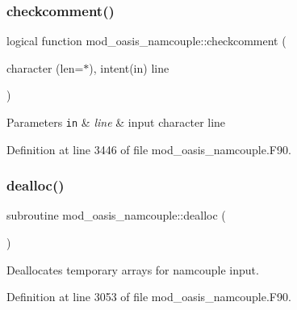 \mbox{\label{namespacemod__oasis__namcouple_a4551fbe4bcd69bc6d0d4f6e1ee52ea86}} 
\subsubsection{\texorpdfstring{checkcomment()}{checkcomment()}}
{\footnotesize\ttfamily logical function mod\+\_\+oasis\+\_\+namcouple\+::checkcomment (\begin{DoxyParamCaption}\item[{character (len=$\ast$), intent(in)}]{line }\end{DoxyParamCaption})\hspace{0.3cm}{\ttfamily [private]}}


\begin{DoxyParams}[1]{Parameters}
\mbox{\tt in}  & {\em line} & input character line \\
\hline
\end{DoxyParams}


Definition at line 3446 of file mod\+\_\+oasis\+\_\+namcouple.\+F90.

\mbox{\label{namespacemod__oasis__namcouple_abf09a0e902f44f77874a75bb4a7fba33}} 
\subsubsection{\texorpdfstring{dealloc()}{dealloc()}}
{\footnotesize\ttfamily subroutine mod\+\_\+oasis\+\_\+namcouple\+::dealloc (\begin{DoxyParamCaption}{ }\end{DoxyParamCaption})\hspace{0.3cm}{\ttfamily [private]}}



Deallocates temporary arrays for namcouple input. 



Definition at line 3053 of file mod\+\_\+oasis\+\_\+namcouple.\+F90.

\mbox{\label{namespacemod__oasis__namcouple_a5f87ffd480c100a94dcdf02f69b23080}} 
